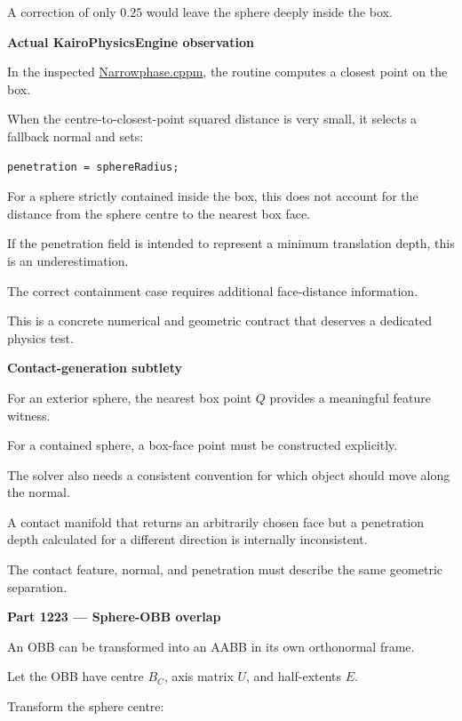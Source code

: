 A correction of only \(0.25\) would leave the sphere deeply inside the box.

\textbf{Actual KairoPhysicsEngine observation}

In the inspected \href{https://github.com/swayam8624/KairoPhysicsEngine/blob/main/Narrowphase.cppm?utm_source=chatgpt.com}{Narrowphase.cppm}, the  routine computes a closest point on the box.

When the centre-to-closest-point squared distance is very small, it selects a fallback normal and sets:

\begin{verbatim}
penetration = sphereRadius;
\end{verbatim}

For a sphere strictly contained inside the box, this does not account for the distance from the sphere centre to the nearest box face.

If the penetration field is intended to represent a minimum translation depth, this is an underestimation.

The correct containment case requires additional face-distance information.

This is a concrete numerical and geometric contract that deserves a dedicated physics test.

\textbf{Contact-generation subtlety}

For an exterior sphere, the nearest box point \(Q\) provides a meaningful feature witness.

For a contained sphere, a box-face point must be constructed explicitly.

The solver also needs a consistent convention for which object should move along the normal.

A contact manifold that returns an arbitrarily chosen face but a penetration depth calculated for a different direction is internally inconsistent.

The contact feature, normal, and penetration must describe the same geometric separation.

\textbf{Part 1223 --- Sphere-OBB overlap}

An OBB can be transformed into an AABB in its own orthonormal frame.

Let the OBB have centre \(B_C\), axis matrix \(U\), and half-extents \(E\).

Transform the sphere centre:

